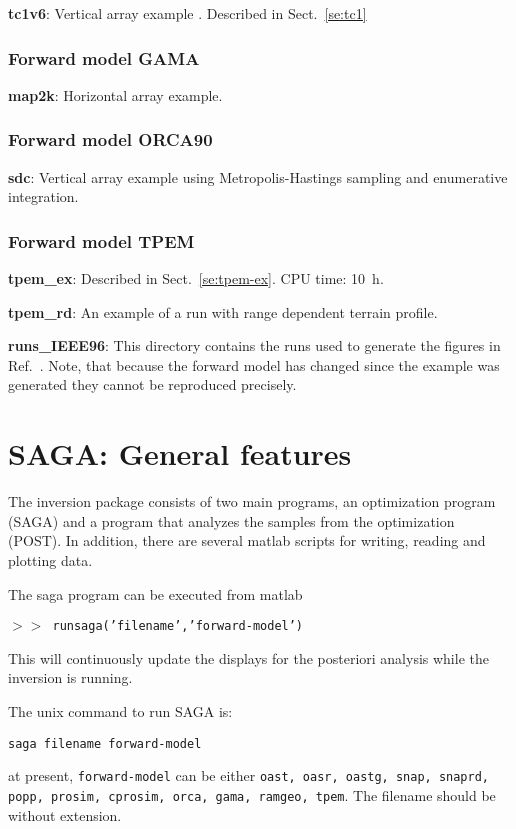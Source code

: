 \documentclass{saclantc}
\begin{document}
\noindent
{\bf tc1v6}: Vertical array example \cite{gerstoft03ph}. Described in Sect.~\ref{se:tc1}

\subsubsection{Forward model GAMA}
\noindent
{\bf map2k}: Horizontal array example.

\subsubsection{Forward model ORCA90}
\noindent
{\bf sdc}: Vertical array example using Metropolis-Hastings sampling and enumerative
integration.

\subsubsection{Forward model TPEM}
\noindent
{\bf tpem\_ex}: Described in Sect.~\ref{se:tpem-ex}. CPU time: 10~h.

\noindent
{\bf tpem\_rd}: An example of a run with  range dependent terrain profile.

\noindent
{\bf runs\_IEEE96}: This directory contains the runs  used to generate the
figures in Ref.\ \cite{gingras:ieee97}. Note, that because the forward
model has changed since the example was generated they cannot be
reproduced precisely.


\section{SAGA: General features}

The inversion package consists of two main programs, an optimization
program ({\sf SAGA}) and a program that analyzes the samples from the
optimization ({\sf POST}). In addition, there are several matlab scripts
for writing, reading and plotting data.

The saga program can be executed    from matlab 

{\tt $ > >$ runsaga('filename','forward-model')}

This will continuously update the displays for the posteriori analysis
while the inversion is running.

The unix command to run {\sf SAGA} is:

{\tt saga filename  forward-model}

at present, {\tt  forward-model}
can be either {\tt oast, oasr, oastg, snap, snaprd, popp, prosim,
cprosim, orca, gama, ramgeo, tpem}.
The filename should be without extension.
\end{document}
